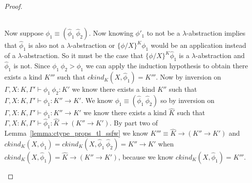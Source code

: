 \begin{proof}
\begin{itemize}
\ \\
Now suppose $\phi_1 \equiv (\hat{\phi}_1\ \hat{\phi}_2)$.  Now knowing $\phi'_1$ to not be a $\lambda$-abstraction
implies that $\hat{\phi}_1$ is also not a $\lambda$-abstraction or $\{\phi/X\}^K \phi_1$ would be an application
instead of a $\lambda$-abstraction.  So it must be the case that $\{\phi/X\}^K \hat{\phi}_1$ is a $\lambda$-abstraction
and $\hat{\phi}_1$ is not.  Since $\phi_1\ \phi_2 > \phi_1$ we can apply the induction hypothesis to obtain there exists
a kind $K'''$ such that $ckind_K(X,\hat{\phi}_1) = K'''$.  
Now by inversion on $\Gamma,X:K,\Gamma' \vdash \phi_1\ \phi_2:K'$ we know there exists a kind $K''$ such that
$\Gamma,X:K,\Gamma' \vdash \phi_1:K'' \to K'$.  We know $\phi_1 \equiv (\hat{\phi}_1\ \hat{\phi}_2)$ so by inversion on
$\Gamma,X:K,\Gamma' \vdash \phi_1:K'' \to K'$ we know there exists a kind $\hat{K}$ such that
$\Gamma,X:K,\Gamma' \vdash \hat{\phi}_1:\hat{K} \to (K'' \to K')$.
By part two of Lemma~\ref{lemma:ctype_props_tl_ssfw} we know $K''' \equiv \hat{K} \to (K'' \to K')$ and
$ckind_K(X,\phi_1) = ckind_K(X,\hat{\phi}_1\ \hat{\phi}_2) = K'' \to K'$ 
when $ckind_K(X,\hat{\phi}_1) = \hat{K} \to (K'' \to K')$, because we know $ckind_K(X,\hat{\phi}_1) = K'''$.
\end{itemize}
\end{proof}

